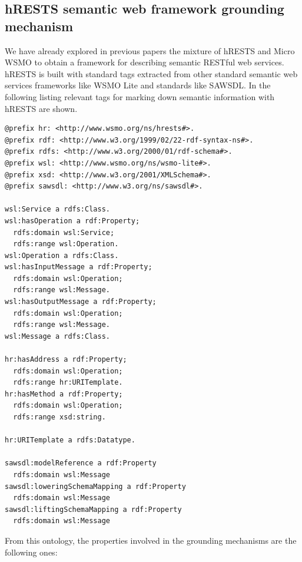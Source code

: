 \subsection{hRESTS semantic web framework grounding mechanism}

We have already explored in previous papers the mixture of hRESTS and Micro WSMO \cite{hrests} to obtain a framework for describing semantic RESTful web services. hRESTS is built with standard tags extracted from other standard semantic web services frameworks like WSMO Lite and standards like SAWSDL. In the following listing relevant tags for marking down semantic information with hRESTS are shown.
\vspace{5 mm}
\begin{lstlisting}
@prefix hr: <http://www.wsmo.org/ns/hrests#>. 
@prefix rdf: <http://www.w3.org/1999/02/22-rdf-syntax-ns#>. 
@prefix rdfs: <http://www.w3.org/2000/01/rdf-schema#>. 
@prefix wsl: <http://www.wsmo.org/ns/wsmo-lite#>. 
@prefix xsd: <http://www.w3.org/2001/XMLSchema#>. 
@prefix sawsdl: <http://www.w3.org/ns/sawsdl#>.

wsl:Service a rdfs:Class. 
wsl:hasOperation a rdf:Property; 
  rdfs:domain wsl:Service; 
  rdfs:range wsl:Operation. 
wsl:Operation a rdfs:Class. 
wsl:hasInputMessage a rdf:Property; 
  rdfs:domain wsl:Operation; 
  rdfs:range wsl:Message. 
wsl:hasOutputMessage a rdf:Property; 
  rdfs:domain wsl:Operation; 
  rdfs:range wsl:Message. 
wsl:Message a rdfs:Class. 
 
hr:hasAddress a rdf:Property; 
  rdfs:domain wsl:Operation; 
  rdfs:range hr:URITemplate. 
hr:hasMethod a rdf:Property; 
  rdfs:domain wsl:Operation; 
  rdfs:range xsd:string. 
 
hr:URITemplate a rdfs:Datatype. 

sawsdl:modelReference a rdf:Property
  rdfs:domain wsl:Message
sawsdl:loweringSchemaMapping a rdf:Property
  rdfs:domain wsl:Message
sawsdl:liftingSchemaMapping a rdf:Property
  rdfs:domain wsl:Message
\end{lstlisting} \vspace{5 mm}

From this ontology, the properties involved in the grounding mechanisms are the following ones:

